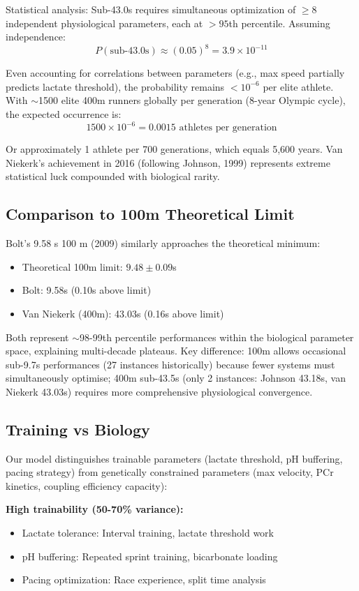 \documentclass[12pt,a4paper]{article}
\begin{document}
Statistical analysis: Sub-43.0s requires simultaneous optimization of $\geq$8 independent physiological parameters, each at $>95$th percentile. Assuming independence:
\[
P(\text{sub-43.0s}) \approx (0.05)^8 = 3.9 \times 10^{-11}
\]

Even accounting for correlations between parameters (e.g., max speed partially predicts lactate threshold), the probability remains $<10^{-6}$ per elite athlete. With $\sim$1500 elite 400m runners globally per generation (8-year Olympic cycle), the expected occurrence is:
\[
1500 \times 10^{-6} = 0.0015 \text{ athletes per generation}
\]

Or approximately 1 athlete per 700 generations, which equals 5,600 years. Van Niekerk's achievement in 2016 (following Johnson, 1999) represents extreme statistical luck compounded with biological rarity.

\subsection{Comparison to 100m Theoretical Limit}

Bolt's 9.58 s 100 m (2009) similarly approaches the theoretical minimum:
\begin{itemize}
    \item Theoretical 100m limit: $9.48 \pm 0.09$s \citep{Pritchard2008}
    \item Bolt: 9.58s (0.10s above limit)
    \item Van Niekerk (400m): 43.03s (0.16s above limit)
\end{itemize}

Both represent $\sim$98-99th percentile performances within the biological parameter space, explaining multi-decade plateaus. Key difference: 100m allows occasional sub-9.7s performances (27 instances historically) because fewer systems must simultaneously optimise; 400m sub-43.5s (only 2 instances: Johnson 43.18s, van Niekerk 43.03s) requires more comprehensive physiological convergence.

\subsection{Training vs Biology}

Our model distinguishes trainable parameters (lactate threshold, pH buffering, pacing strategy) from genetically constrained parameters (max velocity, PCr kinetics, coupling efficiency capacity):

\textbf{High trainability (50-70\% variance):}
\begin{itemize}
    \item Lactate tolerance: Interval training, lactate threshold work
    \item pH buffering: Repeated sprint training, bicarbonate loading
    \item Pacing optimization: Race experience, split time analysis
\end{itemize}
\end{document}
